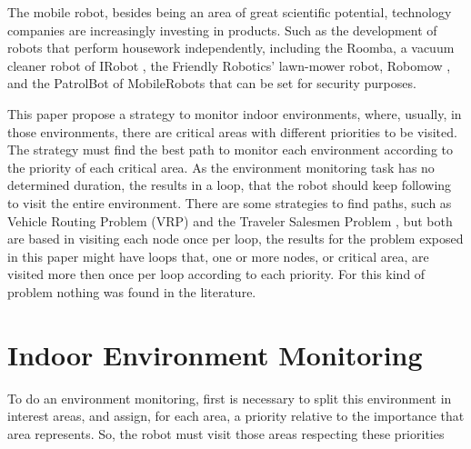 \documentclass[9pt,journal]{IEEEtran}
\begin{document}
The mobile robot, besides being an area of great scientific potential, technology companies are increasingly investing in products. Such as the development of robots that perform housework independently, including the Roomba, a vacuum cleaner robot of IRobot \cite{IRobot}, the Friendly Robotics' lawn-mower robot, Robomow \cite{FriendlyRobotics}, and the PatrolBot of MobileRobots \cite{MobileRobotsPatrolBot} that can be set for security purposes.

This paper propose a strategy to monitor indoor environments, where, usually, in those environments, there are critical areas with different priorities to be visited. The strategy must find the best path to monitor each environment according to the priority of each critical area. As the environment monitoring task has no determined duration, the results in a loop, that the robot should keep following to visit the entire environment. There are some strategies to find paths, such as Vehicle Routing Problem (VRP) and the Traveler Salesmen Problem \cite{Arenales2007}, but both are based in visiting each node once per loop, the results for the problem exposed in this paper might have loops that, one or more nodes, or critical area, are visited more then once per loop according to each priority. For this kind of problem nothing was found in the literature.


	\section{Indoor Environment Monitoring}
	
To do an environment monitoring, first is necessary to split this environment in interest areas, and assign, for each area, a priority relative to the importance that area represents. So, the robot must visit those areas respecting these priorities





	
	
\end{document}
